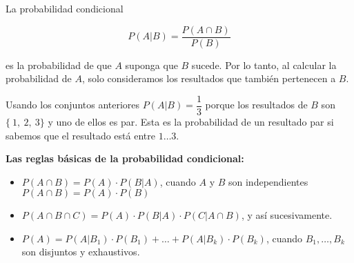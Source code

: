 La probabilidad condicional 

$$P(A|B) = \dfrac{P(A \cap B)}{P(B)}$$

es la probabilidad de que $A$ suponga que $B$ sucede. Por lo tanto, al calcular la probabilidad de $A$, solo consideramos los resultados que también pertenecen a $B$.

Usando los conjuntos anteriores $P(A|B) = \dfrac{1}{3}$ porque los resultados de $B$ son $\{~1,~2,~3\}$ y uno de ellos es par. Esta es la probabilidad de un resultado par si sabemos que el resultado está entre $1 \dots 3$.


\textbf{Las reglas básicas de la probabilidad condicional:}

\begin{itemize}
	\item $P(A \cap B) = P(A)\cdot P(B|A)$, cuando $A$ y $B$ son independientes $P(A \cap B) = P(A)\cdot P(B)$
	\item $P(A \cap B \cap C) = P(A)\cdot P(B|A) \cdot P(C|A \cap B)$, y así sucesivamente.
	\item $P(A) = P(A|B_1) \cdot P(B_1) + \dots + P(A|B_k) \cdot P(B_k)$, cuando $B_1, \dots, B_k$ son disjuntos y exhaustivos.
\end{itemize}

